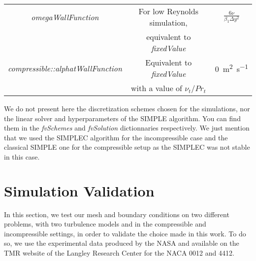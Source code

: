 \begin{subappendices}
\begin{table}
\begin{tabular}{ccc}
			\emph{omegaWallFunction} & For low Reynolds simulation, & $\frac{6\nu}{\beta_1\Delta y^2}$ \\
			& equivalent to \emph{fixedValue} & \vspace{0.2cm} \\
			\emph{compressible::alphatWallFunction} & Equivalent to \emph{fixedValue} & \SI{0}{\square\meter\per\second} \\
			& with a value of $\nu_t/Pr_t$ & \\
			\bottomrule
		\end{tabular}
		\label{tab:bound_cond}
	\end{table}
	
	We do not present here the discretization schemes chosen for the simulations, nor the linear solver and hyperparameters of the SIMPLE algorithm. You can find them in the \emph{fvSchemes} and \emph{fvSolution} dictionnaries respectively. We just mention that we used the SIMPLEC \cite{SIMPLEC} algorithm for the incompressible case and the classical SIMPLE \cite{SIMPLE} one for the compressible setup as the SIMPLEC was not stable in this case.
	
	\section{Simulation Validation}\label{ap:validation}
	In this section, we test our mesh and boundary conditions on two different problems, with two turbulence models and in the compressible and incompressible settings, in order to validate the choice made in this work. To do so, we use the experimental data produced by the \acrshort{NASA} and available on the \acrfull{TMR} website of the Langley Research Center \cite{TMR} for the \acrshort{NACA} 0012 and 4412.
	

\end{subappendices}
